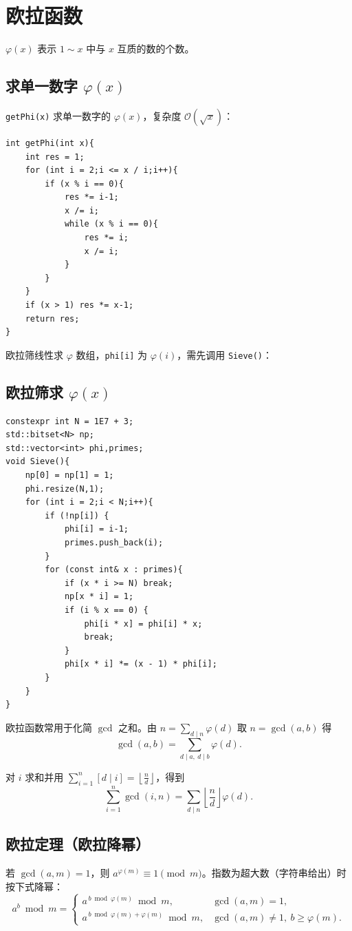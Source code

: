 \section{欧拉函数}

$\varphi(x)$ 表示 $1\sim x$ 中与 $x$ 互质的数的个数。

\subsection{求单一数字 $\varphi(x)$}

\verb|getPhi(x)| 求单一数字的 $\varphi(x)$，复杂度 $\mathcal{O}(\sqrt{x})$：

\begin{lstlisting}
int getPhi(int x){
    int res = 1;
    for (int i = 2;i <= x / i;i++){
        if (x % i == 0){
            res *= i-1;
            x /= i;
            while (x % i == 0){
                res *= i;
                x /= i;
            }
        }
    }
    if (x > 1) res *= x-1;
    return res;
}
\end{lstlisting}

欧拉筛线性求 $\varphi$ 数组，\texttt{phi[i]} 为 $\varphi(i)$，需先调用 \verb|Sieve()|：

\subsection{欧拉筛求 $\varphi(x)$}

\begin{lstlisting}
constexpr int N = 1E7 + 3;
std::bitset<N> np;
std::vector<int> phi,primes;
void Sieve(){
    np[0] = np[1] = 1;
    phi.resize(N,1);
    for (int i = 2;i < N;i++){
        if (!np[i]) {
            phi[i] = i-1;
            primes.push_back(i);
        }
        for (const int& x : primes){
            if (x * i >= N) break;
            np[x * i] = 1;
            if (i % x == 0) {
                phi[i * x] = phi[i] * x;
                break;
            }
            phi[x * i] *= (x - 1) * phi[i];
        }
    }
}
\end{lstlisting}

欧拉函数常用于化简 $\gcd$ 之和。由 $n=\sum_{d\mid n}\varphi(d)$ 取 $n=\gcd(a,b)$ 得
\[ \gcd(a,b)=\sum_{d\mid a,\ d\mid b}\varphi(d). \]

对 $i$ 求和并用 $\sum_{i=1}^{n}[d\mid i]=\left\lfloor\frac{n}{d}\right\rfloor$，得到
\[ \sum_{i=1}^{n}\gcd(i,n)=\sum_{d\mid n}\left\lfloor\frac{n}{d}\right\rfloor\varphi(d). \]

\subsection{欧拉定理（欧拉降幂）}

若 $\gcd(a,m)=1$，则 $a^{\varphi(m)}\equiv 1\pmod{m}$。指数为超大数（字符串给出）时按下式降幂：
\[
a^b \bmod m = \begin{cases}
a^{\,b\bmod\varphi(m)}\bmod m, & \gcd(a,m)=1,\\[4pt]
a^{\,b\bmod\varphi(m)+\varphi(m)}\bmod m, & \gcd(a,m)\ne 1,\ b\ge\varphi(m).
\end{cases}
\]
